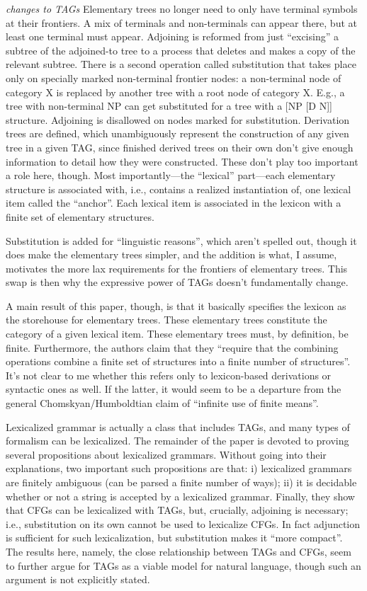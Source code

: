 \documentclass[12pt]{article}
\begin{document}
\pex \textit{changes to TAGs}
\a Elementary trees no longer need to only have terminal symbols at their frontiers. A mix of terminals and non-terminals can appear there, but at least one terminal must appear.
\a Adjoining is reformed from just ``excising'' a subtree of the adjoined-to tree to a process that deletes and makes a copy of the relevant subtree.
\a There is a second operation called substitution that takes place only on specially marked non-terminal frontier nodes: a non-terminal node of category X is replaced by another tree with a root node of category X. E.g., a tree with non-terminal NP can get substituted for a tree with a [NP [D N]] structure. Adjoining is disallowed on nodes marked for substitution.
\a Derivation trees are defined, which unambiguously represent the construction of any given tree in a given TAG, since finished derived trees on their own don't give enough information to detail how they were constructed. These don't play too important a role here, though.
\a Most importantly---the ``lexical'' part---each elementary structure is associated with, i.e., contains a realized instantiation of, one lexical item called the ``anchor''. Each lexical item is associated in the lexicon with a finite set of elementary structures.
\xe

Substitution is added for ``linguistic reasons'', which aren't spelled out, though it does make the elementary trees simpler, and the addition is what, I assume, motivates the more lax requirements for the frontiers of elementary trees. This swap is then why the expressive power of TAGs doesn't fundamentally change. 

A main result of this paper, though, is that it basically specifies the lexicon as the storehouse for elementary trees. These elementary trees constitute the category of a given lexical item. These elementary trees must, by definition, be finite. Furthermore, the authors claim that they ``require that the combining operations combine a finite set of structures into a finite number of structures''. It's not clear to me whether this refers only to lexicon-based derivations or syntactic ones as well. If the latter, it would seem to be a departure from the general Chomskyan/Humboldtian claim of ``infinite use of finite means''.

Lexicalized grammar is actually a class that includes TAGs, and many types of formalism can be lexicalized. The remainder of the paper is devoted to proving several propositions about lexicalized grammars. Without going into their explanations, two important such propositions are that: i) lexicalized grammars are finitely ambiguous (can be parsed a finite number of ways); ii) it is decidable whether or not a string is accepted by a lexicalized grammar. Finally, they show that CFGs can be lexicalized with TAGs, but, crucially, adjoining is necessary; i.e., substitution on its own cannot be used to lexicalize CFGs. In fact adjunction is sufficient for such lexicalization, but substitution makes it ``more compact''. The results here, namely, the close relationship between TAGs and CFGs, seem to further argue for TAGs as a viable model for natural language, though such an argument is not explicitly stated.
\end{document}

